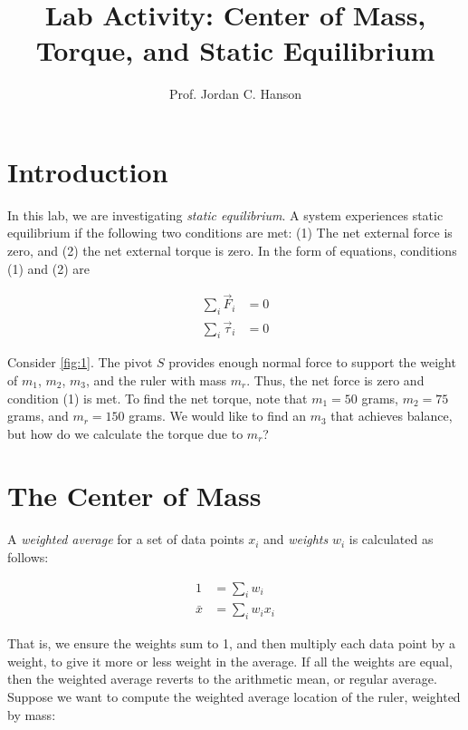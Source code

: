 \documentclass{article}
\begin{document}
\twocolumn

\title{Lab Activity: Center of Mass, Torque, and Static Equilibrium}
\author{Prof. Jordan C. Hanson}

\maketitle

\section{Introduction}

\noindent
In this lab, we are investigating \textit{static equilibrium}.  A system experiences static equilibrium if the following two conditions are met: (1) The net external force is zero, and (2) the net external torque is zero.  In the form of equations, conditions (1) and (2) are

\begin{align}
\sum_i \vec{F}_i &= 0 \\
\sum_i \vec{\tau}_i &= 0
\end{align}

\noindent
Consider \ref{fig:1}.  The pivot $S$ provides enough normal force to support the weight of $m_1$, $m_2$, $m_3$, and the ruler with mass $m_r$.  Thus, the net force is zero and condition (1) is met.  To find the net torque, note that $m_1 = 50$ grams, $m_2 = 75$ grams, and $m_r = 150$ grams.  We would like to find an $m_3$ that achieves balance, but how do we calculate the torque due to $m_r$?

\section{The Center of Mass}

\noindent
A \textit{weighted average} for a set of data points $x_i$ and \textit{weights} $w_i$ is calculated as follows:

\begin{align}
1 &= \sum_i w_i \\
\bar{x} &= \sum_i w_i x_i
\end{align}

\noindent
That is, we ensure the weights sum to 1, and then multiply each data point by a weight, to give it more or less weight in the average.  If all the weights are equal, then the weighted average reverts to the arithmetic mean, or regular average.  Suppose we want to compute the weighted average location of the ruler, weighted by mass:
\end{document}
